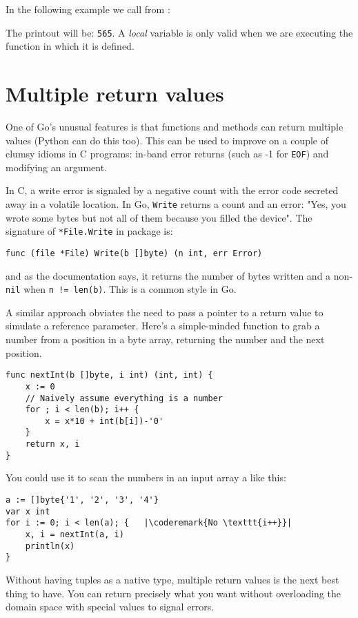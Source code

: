 In the following example we call  from :



The printout will be: \texttt{565}. A \emph{local} variable is only
valid when we are executing the function in which it is defined. 

\section{Multiple return values}
\label{sec:multiple return}
One of Go's unusual features is that functions and methods can return multiple
values (Python can do this too). This can be used to improve on a couple of 
clumsy idioms in C programs:
in-band error returns (such as -1 for \texttt{EOF}) and modifying an argument.

In C, a write error is signaled by a negative count with the error code
secreted away in a volatile location. In Go, \lstinline{Write} returns a count and an
error: "Yes, you wrote some bytes but not all of them because you filled the
device". The signature of \lstinline{*File.Write} in package
 is:
\begin{lstlisting}
func (file *File) Write(b []byte) (n int, err Error)
\end{lstlisting}
and as the documentation says, it returns the number of bytes written and a
non-\lstinline{nil}  when \lstinline{n != len(b)}. This is a common
style in Go.

A similar approach obviates the need to pass a pointer to a return value to
simulate a reference parameter. Here's a simple-minded function to grab a
number from a position in a byte array, returning the number and the next
position.
\begin{lstlisting}
func nextInt(b []byte, i int) (int, int) {
    x := 0
    // Naively assume everything is a number
    for ; i < len(b); i++ {
        x = x*10 + int(b[i])-'0'
    }
    return x, i
}
\end{lstlisting}
You could use it to scan the numbers in an input array a like this:
\begin{lstlisting}
a := []byte{'1', '2', '3', '4'}
var x int
for i := 0; i < len(a); {	|\coderemark{No \texttt{i++}}|
    x, i = nextInt(a, i)
    println(x)
}
\end{lstlisting}
Without having tuples as a native type, multiple return values is the next
best thing to have. You can return precisely what you want without
overloading the domain space with special values to signal errors.

